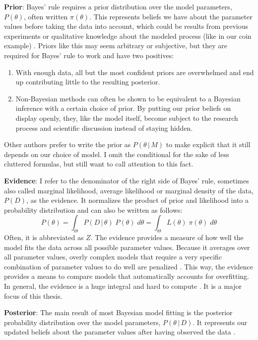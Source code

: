 \documentclass[12pt, a4paper]{report}
\begin{document}
\textbf{Prior}: Bayes' rule requires a prior distribution over the model parameters, $P(\theta)$, often written $\pi(\theta)$.
This represents beliefs we have about the parameter values before taking the data into account, which could be results from previous experiments or qualitative knowledge about the modeled process (like in our coin example) \cite[p. 34 f.]{mcelreath}.
Priors like this may seem arbitrary or subjective, but they are required for Bayes' rule to work and have two positives:
\begin{enumerate}
    \item With enough data, all but the most confident priors are overwhelmed and end up contributing little to the resulting posterior.
    \item Non-Bayesian methods can often be shown to be equivalent to a Bayesian inference with a certain choice of prior. \cite[36]{mcelreath} By putting our prior beliefs on display openly, they, like the model itself, become subject to the research process and scientific discussion instead of staying hidden. 
\end{enumerate}
Other authors prefer to write the prior as $P(\theta \, | \, M)$ to make explicit that it still depends on our choice of model.
I omit the conditional for the sake of less cluttered formulas, but still want to call attention to this fact.

\textbf{Evidence}: I refer to the denominator of the right side of Bayes' rule, sometimes also called marginal likelihood, average likelihood or marginal density of the data, $P(D)$, as the evidence.
It normalizes the product of prior and likelihood into a probability distribution and can also be written as follows: 
\begin{equation}
    P(\theta) = \int_\Theta P(D \,|\, \theta) \; P(\theta) \; d\theta = \int_\Theta L(\theta) \; \pi(\theta) \; d\theta
    \label{eq:evidence}
\end{equation}
Often, it is abbreviated as $Z$.
The evidence provides a measure of how well the model fits the data across all possible parameter values.
Because it averages over all parameter values, overly complex models that require a very specific combination of parameter values to do well are penalized \cite[221]{mcelreath}.
This way, the evidence provides a means to compare models that automatically accounts for overfitting. 
In general, the evidence is a huge integral and hard to compute \cite[221]{mcelreath}.
It is a major focus of this thesis.

\textbf{Posterior}: The main result of most Bayesian model fitting is the posterior probability distribution over the model parameters, $P(\theta \,|\, D)$.
It represents our updated beliefs about the parameter values after having observed the data \cite[36]{mcelreath}.
\end{document}
